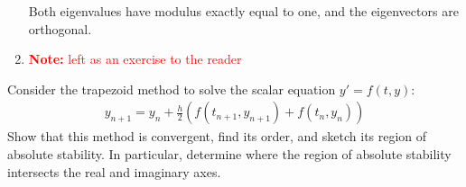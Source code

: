\documentclass[10pt]{article}
\newcommand{\note}[1]{\textcolor{red}{\textbf{Note:} #1}}
\begin{document}
\begin{solution}[Solution]
\begin{enumerate}[label=(\alph*)]
        Both eigenvalues have modulus exactly equal to one, and the eigenvectors are orthogonal.
        
    \item \note{left as an exercise to the reader}

\end{enumerate}
\end{solution}


\begin{problem}
    Consider the trapezoid method to solve the scalar equation \( y' = f(t,y) \):
    \begin{align*}
        y_{n+1} = y_n + \frac{h}{2} \left( f(t_{n+1},y_{n+1}) + f(t_n,y_n) \right)
    \end{align*}
    Show that this method is convergent, find its order, and sketch its region of absolute stability. In particular, determine where the region of absolute stability intersects the real and imaginary axes.
\end{problem}
\end{document}
